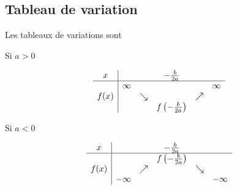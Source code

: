 \subsection{Tableau de variation}

Les tableaux de variations sont
\begin{multicols}{2}

    \begin{center}
        Si \( a>0\)

        \begin{equation*}
            \begin{array}[]{c|ccccc}
                x&&&-\frac{ b }{ 2a }&&\\
                \hline
                &\infty&&&&\infty\\
                f(x)&&\searrow&&\nearrow&\\
                &&&f\left( -\frac{ b }{ 2a } \right)&&\\
            \end{array}
        \end{equation*}
        
    \end{center}

    \columnbreak

    \begin{center}
        Si \( a<0\)


        \begin{equation*}
            \begin{array}[]{c|ccccc}
                x&&&-\frac{ b }{ 2a }&&\\
                \hline
                &&&f\left( -\frac{ b }{ 2a } \right)&&\\
                f(x)&&\nearrow&&\searrow&\\
                &-\infty&&&&-\infty\\
            \end{array}
        \end{equation*}
    \end{center}
\end{multicols}
